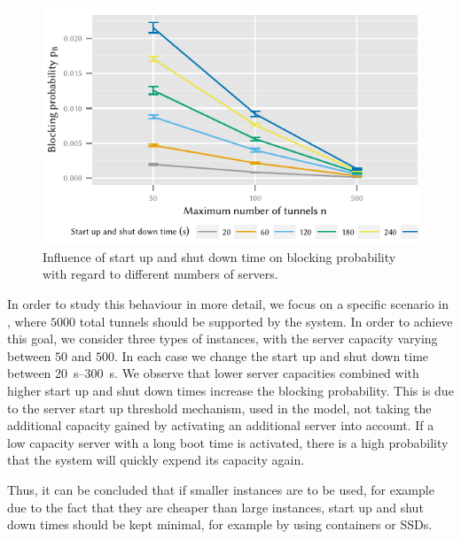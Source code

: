 \begin{figure}
  \centering
  \includegraphics{cloud/virtualized_network_functions/performance_evaluation/figures/compare_maxinstances_block}
  \caption{Influence of start up and shut down time on blocking probability with regard to different numbers of servers.}
  \label{fig:cloud_virtualized_network_functions:startup_shutdown:compare_maxinstances_block}
\end{figure}
 
In order to study this behaviour in more detail, we focus on a specific scenario in , where \(5000\) total tunnels should be supported by the system.
In order to achieve this goal, we consider three types of instances, with the server capacity varying between \(50\) and \(500\).
In each case we change the start up and shut down time between \SIrange{20}{300}{\second}.
We observe that lower server capacities combined with higher start up and shut down times increase the blocking probability.
This is due to the server start up threshold mechanism, used in the model, not taking the additional capacity gained by activating an additional server into account.
If a low capacity server with a long boot time is activated, there is a high probability that the system will quickly expend its capacity again.

Thus, it can be concluded that if smaller instances are to be used, for example due to the fact that they are cheaper than large instances, start up and shut down times should be kept minimal, for example by using containers or \glspl{SSD}.
